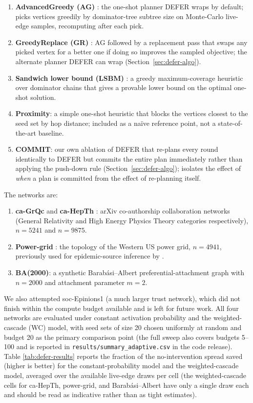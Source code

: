 \documentclass[ijoc,sglanonrev]{informs4}
\begin{document}
\begin{enumerate}
\item \textbf{AdvancedGreedy (AG)} \citep{xie2024}: the one-shot planner
  DEFER wraps by default; picks vertices greedily by dominator-tree
  subtree size on Monte-Carlo live-edge samples, recomputing after each
  pick.
\item \textbf{GreedyReplace (GR)} \citep{xie2024}: AG followed by a
  replacement pass that swaps any picked vertex for a better one if doing
  so improves the sampled objective; the alternate planner DEFER can wrap
  (Section~\ref{sec:defer-algo}).
\item \textbf{Sandwich lower bound (LSBM)} \citep{wang2024sandwich}: a
  greedy maximum-coverage heuristic over dominator chains that gives a
  provable lower bound on the optimal one-shot solution.
\item \textbf{Proximity}: a simple one-shot heuristic that blocks the
  vertices closest to the seed set by hop distance; included as a
  na\"ive reference point, not a state-of-the-art baseline.
\item \textbf{COMMIT}: our own ablation of DEFER that re-plans every round
  identically to DEFER but commits the entire plan immediately rather than
  applying the push-down rule (Section~\ref{sec:defer-algo}); isolates the
  effect of \emph{when} a plan is committed from the effect of re-planning
  itself.
\end{enumerate}

\noindent The networks are:

\begin{enumerate}
\item \textbf{ca-GrQc} and \textbf{ca-HepTh} \citep{leskovec2007}: arXiv
  co-authorship collaboration networks (General Relativity and High Energy
  Physics Theory categories respectively), $n=5241$ and $n=9875$.
\item \textbf{Power-grid} \citep{watts1998}: the topology of the Western
  US power grid, $n=4941$, previously used for epidemic-source inference
  by \citet{lokhov2014}.
\item \textbf{BA(2000)}: a synthetic Barab\'asi--Albert preferential-attachment
  graph \citep{barabasi1999} with $n=2000$ and attachment parameter $m=2$.
\end{enumerate}

\noindent We also attempted soc-Epinions1 (a much larger trust network),
which did not finish within the compute budget available and is left for
future work. All four networks are evaluated under constant activation
probability and the weighted-cascade (WC) model, with seed sets of size 20
chosen uniformly at random and budget 20 as the primary comparison point
(the full sweep also covers budgets 5--100 and is reported in
\texttt{results/summary\_adaptive.csv} in the code release). Table
\ref{tab:defer-results} reports the fraction of the no-intervention spread
saved (higher is better) for the constant-probability model and the
weighted-cascade model, averaged over the available live-edge draws per
cell (the weighted-cascade cells for ca-HepTh, power-grid, and
Barab\'asi--Albert have only a single draw each and should be read as
indicative rather than as tight estimates).
\end{document}
